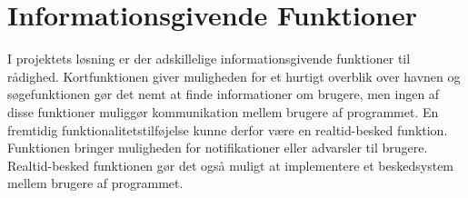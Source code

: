 \section{Informationsgivende Funktioner}
I projektets løsning er der adskillelige informationsgivende funktioner til rådighed. Kortfunktionen giver muligheden for et hurtigt overblik over havnen og søgefunktionen gør det nemt at finde informationer om brugere, men ingen af disse funktioner muliggør kommunikation mellem brugere af programmet. En fremtidig funktionalitetstilføjelse kunne derfor være en realtid-besked funktion. Funktionen bringer muligheden for notifikationer eller advarsler til brugere. Realtid-besked funktionen gør det også muligt at implementere et beskedsystem mellem brugere af programmet.

